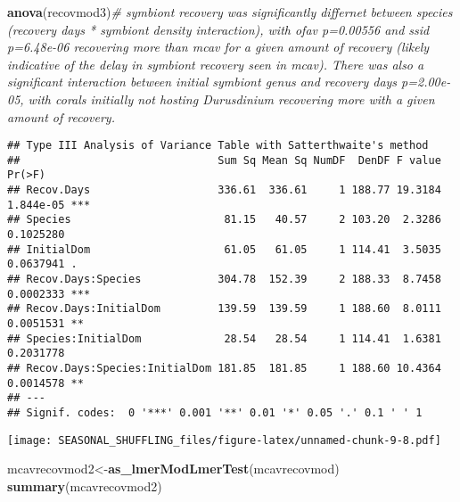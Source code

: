 \documentclass[]{article}
\newenvironment{Shaded}{\begin{snugshade}}{\end{snugshade}}
\newcommand{\CommentTok}[1]{\textcolor[rgb]{0.56,0.35,0.01}{\textit{#1}}}
\newcommand{\DataTypeTok}[1]{\textcolor[rgb]{0.13,0.29,0.53}{#1}}
\newcommand{\DecValTok}[1]{\textcolor[rgb]{0.00,0.00,0.81}{#1}}
\newcommand{\KeywordTok}[1]{\textcolor[rgb]{0.13,0.29,0.53}{\textbf{#1}}}
\newcommand{\NormalTok}[1]{#1}
\newcommand{\OperatorTok}[1]{\textcolor[rgb]{0.81,0.36,0.00}{\textbf{#1}}}
\newcommand{\StringTok}[1]{\textcolor[rgb]{0.31,0.60,0.02}{#1}}
\begin{document}
\begin{Shaded}
\begin{Highlighting}[]
\KeywordTok{anova}\NormalTok{(recovmod3)}\CommentTok{# symbiont recovery was significantly differnet between species (recovery days * symbiont density interaction), with ofav p=0.00556 and ssid p=6.48e-06 recovering more than mcav for a given amount of recovery (likely indicative of the delay in symbiont recovery seen in mcav). There was also a significant interaction between initial symbiont genus and recovery days p=2.00e-05, with corals initially not hosting Durusdinium recovering more with a given amount of recovery. }
\end{Highlighting}
\end{Shaded}

\begin{verbatim}
## Type III Analysis of Variance Table with Satterthwaite's method
##                               Sum Sq Mean Sq NumDF  DenDF F value    Pr(>F)    
## Recov.Days                    336.61  336.61     1 188.77 19.3184 1.844e-05 ***
## Species                        81.15   40.57     2 103.20  2.3286 0.1025280    
## InitialDom                     61.05   61.05     1 114.41  3.5035 0.0637941 .  
## Recov.Days:Species            304.78  152.39     2 188.33  8.7458 0.0002333 ***
## Recov.Days:InitialDom         139.59  139.59     1 188.60  8.0111 0.0051531 ** 
## Species:InitialDom             28.54   28.54     1 114.41  1.6381 0.2031778    
## Recov.Days:Species:InitialDom 181.85  181.85     1 188.60 10.4364 0.0014578 ** 
## ---
## Signif. codes:  0 '***' 0.001 '**' 0.01 '*' 0.05 '.' 0.1 ' ' 1
\end{verbatim}

\begin{Shaded}
\end{Shaded}

\texttt{[image: SEASONAL\_SHUFFLING\_files/figure-latex/unnamed-chunk-9-8.pdf]}

\begin{Shaded}
\begin{Highlighting}[]
\NormalTok{  mcavrecovmod2<-}\KeywordTok{as_lmerModLmerTest}\NormalTok{(mcavrecovmod)}
  \KeywordTok{summary}\NormalTok{(mcavrecovmod2)}
\end{Highlighting}
\end{Shaded}
\end{document}
